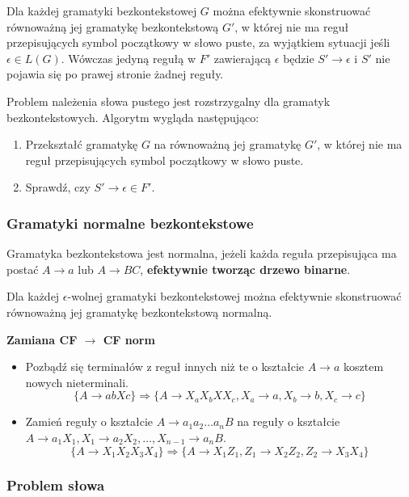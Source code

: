 \documentclass{../notatki}
\begin{document}
Dla każdej gramatyki bezkontekstowej $G$ można efektywnie skonstruować
równoważną jej gramatykę bezkontekstową $G'$, w której nie ma reguł
przepisujących symbol początkowy w słowo puste, za wyjątkiem sytuacji jeśli
$\epsilon \in L(G)$. Wówczas jedyną regułą w $F'$ zawierającą $\epsilon$ będzie
$S' \rightarrow \epsilon$ i $S'$ nie pojawia się po prawej stronie żadnej
reguły.

Problem należenia słowa pustego jest rozstrzygalny dla gramatyk
bezkontekstowych. Algorytm wygląda następująco:

\begin{enumerate}
  \item Przekształć gramatykę $G$ na równoważną jej gramatykę $G'$, w której
    nie ma reguł przepisujących symbol początkowy w słowo puste.
  \item Sprawdź, czy $S' \rightarrow \epsilon \in F'$.
\end{enumerate}

\subsubsection{Gramatyki normalne bezkontekstowe}

Gramatyka bezkontekstowa jest normalna, jeżeli każda reguła przepisująca ma
postać $A \rightarrow a$ lub $A \rightarrow BC$, \textbf{efektywnie tworząc
drzewo binarne}.

Dla każdej $\epsilon$-wolnej gramatyki bezkontekstowej można efektywnie
skonstruować równoważną jej gramatykę bezkontekstową normalną.

\noindent \textbf{Zamiana CF $\rightarrow$ CF norm}

\begin{itemize}
  \item Pozbądź się terminałów z reguł innych niż te o kształcie $A
    \rightarrow a$ kosztem nowych nieterminali.
    $$
    \{A \rightarrow abXc\} \Rightarrow \{A \rightarrow X_aX_bXX_c, X_a
    \rightarrow a, X_b \rightarrow b, X_c \rightarrow c\}
    $$
  \item Zamień reguły o kształcie $A \rightarrow a_1a_2\dots a_nB$ na reguły
    o kształcie $A \rightarrow a_1X_1, X_1 \rightarrow a_2X_2, \dots, X_{n-1}
    \rightarrow a_nB$.
    $$
    \{A \rightarrow X_1X_2X_3X_4\} \Rightarrow \{A \rightarrow X_1Z_1, Z_1
    \rightarrow X_2Z_2, Z_2 \rightarrow X_3X_4\}
    $$
\end{itemize}

\subsubsection{Problem słowa}
\end{document}
